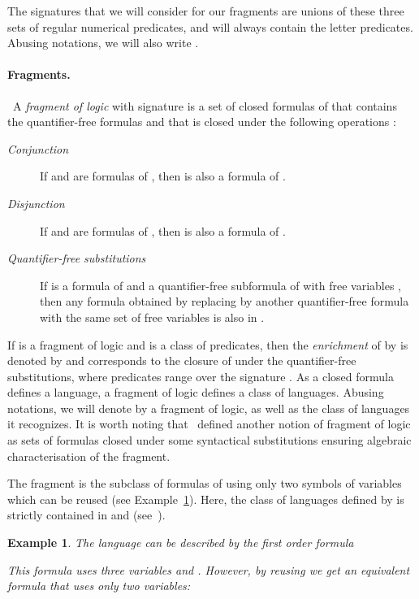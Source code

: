 \documentclass[submission,hidelink]{dmtcs-episciences}
\newtheorem{example}{Example}
\begin{document}
The signatures that we will consider for our fragments are unions of these three sets of regular numerical predicates, and will always contain the letter predicates.
Abusing notations, we will also write .


\paragraph{Fragments.}
\
A \emph{fragment of logic}  with signature  is a set of closed formulas of 
	that contains the quantifier-free formulas and that is
	closed
	under the following operations :
	\begin{description}
	\item[\textit{Conjunction}] If  and  are formulas of ,
				then  is also a formula of .
	\item[\textit{Disjunction}] If  and  are formulas of ,
				then  is also a formula of .
\item[\textit{Quantifier-free substitutions}] If  is a formula of  and  a quantifier-free subformula of  with free variables , then any formula obtained by replacing  by another quantifier-free formula with the same set of free variables is also in .
	\end{description}

	If  is a fragment of logic and  is a class of predicates, then the \emph{enrichment} of  by  is denoted by  and corresponds to the closure of  under the quantifier-free substitutions, where predicates range over the signature .
As a closed formula defines a language, a fragment of logic defines a class of languages. Abusing notations, we will denote by  a
	fragment of logic, as well as the class of languages it recognizes.
	It is worth noting that~\cite{KL12} defined another notion of fragment of logic as sets of
	formulas closed under some syntactical substitutions ensuring algebraic characterisation of the fragment.

	The fragment  is the subclass of formulas of  using only two symbols of variables which can be reused (see Example~\ref{FO2:ex}).
	Here, the class of languages defined by  is strictly contained in  and  (see~\cite{TW98,DP13}).
	\begin{example}\label{FO2:ex}
	The language  can be described by the first order formula
	
	This formula uses three variables  and . However, by reusing  we get an equivalent formula that uses only two variables:
	
	\end{example}
\end{document}
